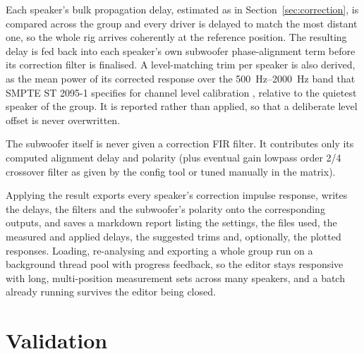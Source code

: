 \documentclass[10pt,a4paper]{article}
\begin{document}
Each speaker's bulk propagation delay, estimated as in Section~\ref{sec:correction}, is compared across the group and every driver is delayed to match the most distant one, so the whole rig arrives coherently at the reference position. The resulting delay is fed back into each speaker's own subwoofer phase-alignment term before its correction filter is finalised. A level-matching trim per speaker is also derived, as the mean power of its corrected response over the \SIrange{500}{2000}{\hertz} band that SMPTE ST 2095-1 specifies for channel level calibration \cite{SMPTE2095}, relative to the quietest speaker of the group. It is reported rather than applied, so that a deliberate level offset is never overwritten.

The subwoofer itself is never given a correction FIR filter. It contributes only its computed alignment delay and polarity (plus eventual gain lowpass order 2/4 crossover filter as given by the config tool or tuned manually in the matrix).

Applying the result exports every speaker's correction impulse response, writes the delays, the filters and the subwoofer's polarity onto the corresponding outputs, and saves a markdown report listing the settings, the files used, the measured and applied delays, the suggested trims and, optionally, the plotted responses. Loading, re-analysing and exporting a whole group run on a background thread pool with progress feedback, so the editor stays responsive with long, multi-position measurement sets across many speakers, and a batch already running survives the editor being closed.

\section{Validation}\label{sec:validation}
\end{document}
